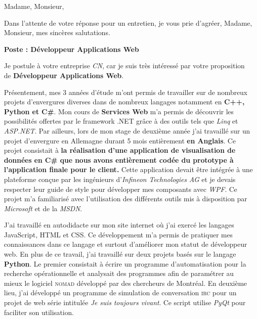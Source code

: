 \date{\today}
\opening{Madame, Monsieur,}
\closing{Dans l'attente de votre réponse pour un entretien, je vous prie d'agréer, Madame, Monsieur, mes sincères salutations.}

\makelettertitle

\textbf{Poste : Développeur Applications Web}

\introduction{}
Je postule à votre entreprise \textit{CN}, car je suis très intéressé par votre proposition de \textbf{Développeur Applications Web}.

Présentement, mes 3 années d'étude m'ont permis de travailler sur de nombreux projets d'envergures diverses dans de nombreux langages notamment en \textbf{C++, Python et C\#}. Mon cours de \textbf{Services Web} m'a permis de découvrir les possibilités offertes par le framework .NET grâce à des outils tels que \textit{Linq} et \textit{ASP.NET}. Par ailleurs, lors de mon stage de deuxième année j'ai travaillé sur un projet d'envergure en Allemagne durant 5 mois entièrement \textbf{en Anglais}. Ce projet consistait à \textbf{la réalisation d'une application de visualisation de données en C\# que nous avons entièrement codée du prototype à l'application finale pour le client.} Cette application devait être intégrée à une plateforme conçue par les ingénieurs d'\textit{Infineon Technologies AG} et je devais respecter leur guide de style pour développer mes composants avec \textit{WPF}. Ce projet m'a familiarisé avec l'utilisation des différents outils mis à disposition par \textit{Microsoft} et de la \textit{MSDN}.

J'ai travaillé en autodidacte sur mon site internet où j'ai exercé les langages JavaScript, HTML et CSS. Ce développement m'a permis de pratiquer mes connaissances dans ce langage et surtout d'améliorer mon statut de développeur web. En plus de ce travail, j'ai travaillé sur deux projets basés sur le langage \textbf{Python}. Le premier consistait à écrire un programme d'automatisation pour la recherche opérationnelle et analysait des programmes afin de paramétrer au mieux le logiciel \textsc{nomad} développé par des chercheurs de Montréal. En deuxième lieu, j'ai développé un programme de simulation de conversation \textsc{irc} pour un projet de web série intitulée \textit{Je suis toujours vivant}. Ce script utilise \textit{PyQt} pour faciliter son utilisation. \conclusion{}

\makeletterclosing
